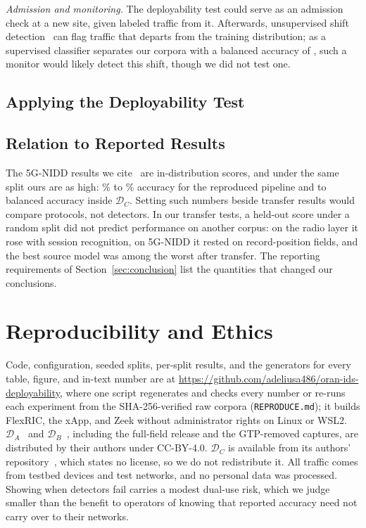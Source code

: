\documentclass{ieeeaccess}
\newcommand{\DA}{\ensuremath{\mathcal{D}_{A}}}
\newcommand{\DB}{\ensuremath{\mathcal{D}_{B}}}
\newcommand{\DC}{\ensuremath{\mathcal{D}_{C}}}
\begin{document}
\emph{Admission and monitoring.} The deployability test could serve as an admission check at a new site, given labeled traffic from it. Afterwards, unsupervised shift detection~\cite{rabanser2019failing} can flag traffic that departs from the training distribution; as a supervised classifier separates our corpora with a balanced accuracy of \DomShared{}, such a monitor would likely detect this shift, though we did not test one.

\subsection{Applying the Deployability Test}
\label{sec:disc:predicate}



\subsection{Relation to Reported Results}

The 5G-NIDD results we cite~\cite{samarakoon2022niddarxiv,ilias2024moe5g} are in-distribution scores, and under the same split ours are as high: \PubRzAccMin\% to \PubRzAccMax\% accuracy for the reproduced pipeline and \ThRefShRandBAmin{} to \ThRefShRandBAmax{} balanced accuracy inside \DC{}. Setting such numbers beside transfer results would compare protocols, not detectors. In our transfer tests, a held-out score under a random split did not predict performance on another corpus: on the radio layer it rose with session recognition, on 5G-NIDD it rested on record-position fields, and the best source model was among the worst after transfer. The reporting requirements of Section~\ref{sec:conclusion} list the quantities that changed our conclusions.

\section{Reproducibility and Ethics}
\label{sec:repro}

Code, configuration, seeded splits, per-split results, and the generators for every table, figure, and in-text number are at \textcolor{blue}{\url{https://github.com/adeliusa486/oran-ids-deployability}}, where one script regenerates and checks every number or re-runs each experiment from the SHA-256-verified raw corpora (\texttt{REPRODUCE.md}); it builds FlexRIC, the xApp, and Zeek without administrator rights on Linux or WSL2. \DA{}~\cite{abedzadeh2025netslab} and \DB{}~\cite{samarakoon2022nidd}, including the full-field release and the GTP-removed captures, are distributed by their authors under CC-BY-4.0. \DC{} is available from its authors' repository~\cite{nugraha2025fivegdatasets}, which states no license, so we do not redistribute it. All traffic comes from testbed devices and test networks, and no personal data was processed. Showing when detectors fail carries a modest dual-use risk, which we judge smaller than the benefit to operators of knowing that reported accuracy need not carry over to their networks.
\end{document}
